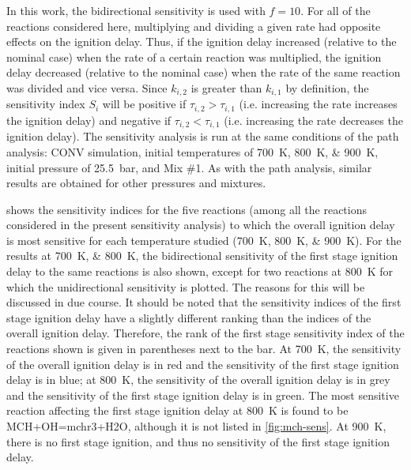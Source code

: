 \documentclass[../main.tex]{subfiles}
\begin{document}
In this work, the bidirectional sensitivity is used with $f=10$. For all of the
reactions considered here, multiplying and dividing a given rate had opposite
effects on the ignition delay. Thus, if the ignition delay increased (relative
to the nominal case) when the rate of a certain reaction was multiplied, the
ignition delay decreased (relative to the nominal case) when the rate of the
same reaction was divided and vice versa. Since $k_{i,2}$ is greater than
$k_{i,1}$ by definition, the sensitivity index $S_i$ will be positive if
$\tau_{i,2}>\tau_{i,1}$ (i.e. increasing the rate increases the ignition delay)
and negative if $\tau_{i,2}<\tau_{i,1}$ (i.e. increasing the rate decreases the
ignition delay). The sensitivity analysis is run at the same conditions of the
path analysis: CONV simulation, initial temperatures of \SIlist{700;800;900}{\kelvin},
initial pressure of \SI{25.5}{\bar}, and Mix \#1. As with the path analysis, similar
results are obtained for other pressures and mixtures.

 shows the sensitivity indices for the five reactions
(among all the reactions considered in the present sensitivity analysis) to
which the overall ignition delay is most sensitive for each temperature studied
(\SIlist{700;800;900}{\kelvin}). For the results at \SIlist{700;800}{\kelvin}, the
bidirectional sensitivity of the first stage ignition delay to the same
reactions is also shown, except for two reactions at \SI{800}{\kelvin} for which the
unidirectional sensitivity is plotted. The reasons for this will be discussed
in due course. It should be noted that the sensitivity indices of the first
stage ignition delay have a slightly different ranking than the indices of the
overall ignition delay. Therefore, the rank of the first stage sensitivity
index of the reactions shown is given in parentheses next to the bar. At \SI{700}{\kelvin},
the sensitivity of the overall ignition delay is in red and the sensitivity of
the first stage ignition delay is in blue; at \SI{800}{\kelvin}, the sensitivity of the
overall ignition delay is in grey and the sensitivity of the first stage
ignition delay is in green. The most sensitive reaction affecting the first
stage ignition delay at \SI{800}{\kelvin} is found to be MCH+OH=mchr3+H2O, although it is
not listed in \cref{fig:mch-sens}. At \SI{900}{\kelvin}, there is no first stage
ignition, and thus no sensitivity of the first stage ignition delay.
\end{document}
